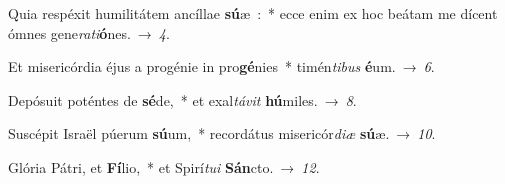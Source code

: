 ﻿\item Quia respéxit humilitátem ancíllae \textbf{sú}æ~:~*
ecce enim ex hoc beátam me dícent ómnes gene\emph{ra}\emph{ti}\textbf{ó}nes.~→~\emph{4}.
\item Et misericórdia éjus a progénie in pro\textbf{gé}nies~*
timén\emph{ti}\-\emph{bus} \textbf{é}um.~→~\emph{6}.
\item Depósuit poténtes de \textbf{sé}de,~*
et exal\emph{tá}\-\emph{vit} \textbf{hú}miles.~→~\emph{8}.
\item Suscépit Israël púerum \textbf{sú}um,~*
recordátus misericór\emph{di}\-\emph{æ} \textbf{sú}æ.~→~\emph{10}.
\item Glória Pátri, et \textbf{Fí}lio,~*
et Spirí\emph{tu}\-\emph{i} \textbf{Sán}cto.~→~\emph{12}.
